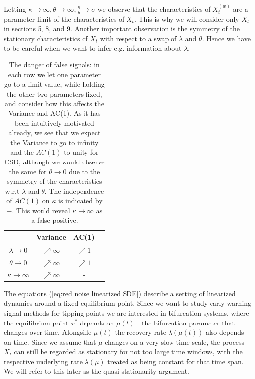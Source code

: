 \documentclass[%
thesis=student,%
coverpage=false,%
titlepage=false,%
headmarks=true, %
english,%
font=libertine, %
math=newpxtx, %
BCOR=5mm,%
coverBCOR=11mm%
]{tumbook}
\begin{document}
Letting $\kappa \rightarrow \infty, \theta \rightarrow \infty, \frac{\kappa}{\theta} \rightarrow \sigma$ we observe that the characteristics of $X_{t}^{(w)}$ are a parameter limit of the characteristics of $X_{t}$. This is why we will consider only $X_{t}$ in sections 5, 8, and 9.
Another important observation is the symmetry of the stationary characteristics of $X_{t}$ with respect to a swap of $\lambda$ and $\theta$. Hence we have to be careful when we want to infer e.g. information about $\lambda$.

\begin{table}[h!]
\centering
\begin{tabular}{|c|c|c|c|}
\hline
& Variance & AC(1)\\
\hline
$\lambda \rightarrow 0$ & $\nearrow \infty$ & $\nearrow 1$ \\
$\theta \rightarrow 0$  & $\nearrow \infty$ & $\nearrow 1$ \\
$\kappa \rightarrow \infty$ & $\nearrow \infty$ & - \\    
\hline
\end{tabular}
\caption{The danger of false signals: in each row we let one parameter go to a limit value, while holding the other two parameters fixed, and consider how this affects the Variance and AC(1). As it has been intuitively motivated already, we see that we expect the Variance to go to infinity and the $AC(1)$ to unity for CSD, although we would observe the same for $\theta \rightarrow 0$ due to the symmetry of the characteristics w.r.t $\lambda$ and $\theta$. The independence of $AC(1)$ on $\kappa$ is indicated by $-$. This would reveal $\kappa \rightarrow \infty$ as a false positive.}
\label{tab:danger_of_false_signals}
\end{table}

The equations (\ref{eq:red noise linearized SDE}) describe a setting of linearized dynamics around a fixed equilibrium point. Since we want to study early warning signal methods for tipping points we are interested in bifurcation systems, where the equilibrium point $x^{*}$ depends on $\mu(t)$ - the bifurcation parameter that changes over time. Alongside $\mu(t)$ the recovery rate $\lambda(\mu(t))$ also depends on time. Since we assume that $\mu$ changes on a very slow time scale, the process $X_{t}$ can still be regarded as stationary for not too large time windows, with the respective underlying rate $\lambda(\mu)$ treated as being constant for that time span. We will refer to this later as the quasi-stationarity argument.
\end{document}
